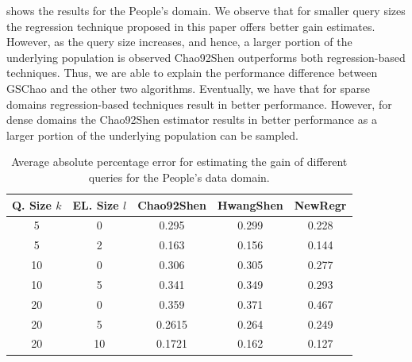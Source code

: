  shows the results for the People's domain. We observe that for smaller query sizes the regression technique proposed in this paper offers better gain estimates. However, as the query size increases, and hence, a larger portion of the underlying population is observed Chao92Shen outperforms both regression-based techniques. Thus, we are able to explain the performance difference between GSChao and the other two algorithms. Eventually, we have that for sparse domains regression-based techniques result in better performance. However, for dense domains the Chao92Shen estimator results in better performance as a larger portion of the underlying population can be sampled. 

\begin{table}[h]
\vspace{-5pt}
\scriptsize \center
\caption{Average absolute percentage error for estimating the gain of different queries for the People's data domain.}
\vspace{-5pt}
\label{tab:peopleesterror}
\begin{tabular}{|c|c|c|c|c|}
\hline
\textbf{Q. Size $k$} & \textbf{EL. Size $l$} & \textbf{Chao92Shen} & \textbf{HwangShen} & \textbf{NewRegr} \\ \hline
5 & 0 & 0.295 & 0.299 & 0.228\\
5 & 2 & 0.163 &  0.156 & 0.144\\
10 & 0 &  0.306 & 0.305 & 0.277\\
10 & 5 &  0.341 & 0.349 & 0.293\\
20 & 0 &  0.359& 0.371 & 0.467 \\
20 & 5 &  0.2615 & 0.264 & 0.249\\
20 & 10 & 0.1721 & 0.162 & 0.127\\
\hline
\end{tabular}
\vspace{-15pt}
\end{table}



